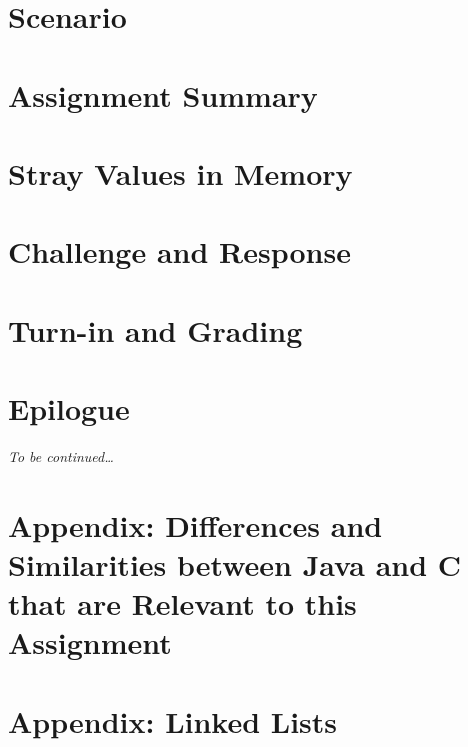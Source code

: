 \documentclass[12pt]{article}
\begin{document}
    \labidentifier


    \softwareengineeringfrontmatter

    \section*{Scenario}                                             \scenariointroduction

    \section{Assignment Summary}                                    

    \section{Stray Values in Memory} \label{sec:archiesCode}        

    \section{Challenge and Response} \label{sec:challengeResponse}  

    \section{Turn-in and Grading}                                   

    \section*{Epilogue}                                             \scenariowrapup

    \textit{To be continued\dots}

    \newpage\appendix

    \section{Appendix: Differences and Similarities between Java and C that are Relevant to this Assignment}
                                                                    

    \section{Appendix: Linked Lists}                                
\end{document}
